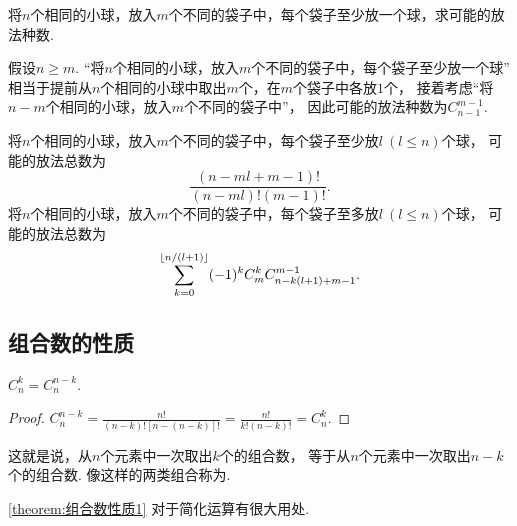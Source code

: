 \begin{example}
将\(n\)个相同的小球，放入\(m\)个不同的袋子中，每个袋子至少放一个球，求可能的放法种数.
\begin{solution}
假设\(n \geq m\).
“将\(n\)个相同的小球，放入\(m\)个不同的袋子中，每个袋子至少放一个球”
相当于提前从\(n\)个相同的小球中取出\(m\)个，在\(m\)个袋子中各放\(1\)个，
接着考虑“将\(n-m\)个相同的小球，放入\(m\)个不同的袋子中”，
因此可能的放法种数为\(C_{n-1}^{m-1}\).
\end{solution}
\end{example}
\begin{remark}
将\(n\)个相同的小球，放入\(m\)个不同的袋子中，每个袋子至少放\(l\ (l \leq n)\)个球，
可能的放法总数为\begin{equation*}
	\frac{(n-ml+m-1)!}{(n-ml)!(m-1)!}.
\end{equation*}
将\(n\)个相同的小球，放入\(m\)个不同的袋子中，每个袋子至多放\(l\ (l \leq n)\)个球，
可能的放法总数为\begin{equation*}
	\sum_{k=0}^{\lfloor n/(l+1)\rfloor} (-1)^k C_m^k C_{n-k(l+1)+m-1}^{m-1}.
\end{equation*}
\end{remark}

\subsection{组合数的性质}
\begin{property}\label{theorem:组合数性质1}
\(C_n^k = C_n^{n-k}\).
\begin{proof}
\(
	C_n^{n-k}
	= \frac{n!}{(n-k)! [n-(n-k)]!}
	= \frac{n!}{k! (n-k)!}
	= C_n^k
\).
\end{proof}
\end{property}
这就是说，从\(n\)个元素中一次取出\(k\)个的组合数，
等于从\(n\)个元素中一次取出\(n-k\)个的组合数.
像这样的两类组合称为.

\cref{theorem:组合数性质1} 对于简化运算有很大用处.

